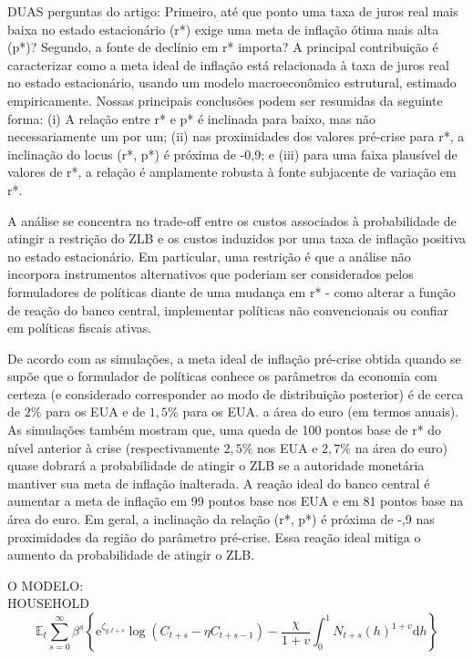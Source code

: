 DUAS perguntas do artigo: Primeiro, até que ponto uma taxa de juros real mais baixa no estado estacionário (r*) exige uma meta de inflação ótima mais alta (p*)? Segundo, a fonte de declínio em r* importa? A principal contribuição é caracterizar como a meta ideal de inflação está relacionada à taxa de juros real no estado estacionário, usando um modelo macroeconômico estrutural, estimado empiricamente. Nossas principais conclusões podem ser resumidas da seguinte forma: (i) A relação entre r* e p* é inclinada para baixo, mas não necessariamente um por um; (ii) nas proximidades dos valores pré-crise para r*, a inclinação do locus (r*, p*) é próxima de -0,9; e (iii) para uma faixa plausível de valores de r*, a relação é amplamente robusta à fonte subjacente de variação em r*.

A análise se concentra no trade-off entre os custos associados à probabilidade de atingir a restrição do ZLB e os custos induzidos por uma taxa de inflação positiva no estado estacionário. Em particular, uma restrição é que a análise não incorpora instrumentos alternativos que poderiam ser considerados pelos formuladores de políticas diante de uma mudança em r* - como alterar a função de reação do banco central, implementar políticas não convencionais ou confiar em políticas fiscais ativas.

De acordo com as simulações, a meta ideal de inflação pré-crise obtida quando se supõe que o formulador de políticas conhece os parâmetros da economia com certeza (e considerado corresponder ao modo de distribuição posterior) é de cerca de $2\%$ para os EUA e de $1,5\%$ para os EUA. a área do euro (em termos anuais). As simulações também mostram que, uma queda de 100 pontos base de r* do nível anterior à crise (respectivamente $2,5\%$ nos EUA e $2,7\%$ na área do euro) quase dobrará a probabilidade de atingir o ZLB se a autoridade monetária mantiver sua meta de inflação inalterada. A reação ideal do banco central é aumentar a meta de inflação em 99 pontos base nos EUA e em 81 pontos base na área do euro. Em geral, a inclinação da relação (r*, p*) é próxima de -,9 nas proximidades da região do parâmetro pré-crise. Essa reação ideal mitiga o aumento da probabilidade de atingir o ZLB.

O MODELO:\\

HOUSEHOLD
\[
\mathbb{E}_{t} \sum_{s=0}^{\infty} \beta^{s}\left\{\mathrm{e}^{\zeta_{g, t+s}} \log \left(C_{t+s}-\eta C_{t+s-1}\right)-\frac{\chi}{1+v} \int_{0}^{1} N_{t+s}(h)^{1+v} \mathrm{d} h\right\}
\]

